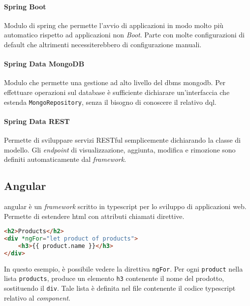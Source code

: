 \paragraph*{Spring Boot} Modulo di \gls{spring} che permette l'avvio di applicazioni in modo molto più automatico rispetto ad applicazioni non \textit{Boot}. Parte con molte configurazioni di default che altrimenti necessiterebbero di configurazione manuali.

\paragraph*{Spring Data MongoDB} Modulo che permette una gestione ad alto livello del \acrshort{dbms} \gls{mongodb}.
Per effettuare operazioni sul database è sufficiente dichiarare un'interfaccia che estenda \texttt{MongoRepository}, senza il bisogno di conoscere il relativo \gls{dql}.

\paragraph*{Spring Data REST} Permette di sviluppare servizi RESTful semplicemente dichiarando la classe di modello.
Gli \textit{endpoint} di visualizzazione, aggiunta, modifica e rimozione sono definiti automaticamente dal \textit{framework}.

\subsection{Angular}

\gls{angular} è un \textit{framework} scritto in \gls{typescript} per lo sviluppo di applicazioni web.
Permette di estendere \acrshort{html} con attributi chiamati direttive.

\begin{tcolorbox}
	\begin{lstlisting}[language=html]
<h2>Products</h2>
<div *ngFor="let product of products">
    <h3>{{ product.name }}</h3>
</div>
	\end{lstlisting}
\end{tcolorbox}

In questo esempio, è possibile vedere la direttiva \texttt{ngFor}. Per ogni \texttt{product} nella lista \texttt{products}, produce un elemento \texttt{h3} contenente il nome del prodotto, sostituendo il \texttt{div}. Tale lista è definita nel file contenente il codice \gls{typescript} relativo al \textit{component}.

